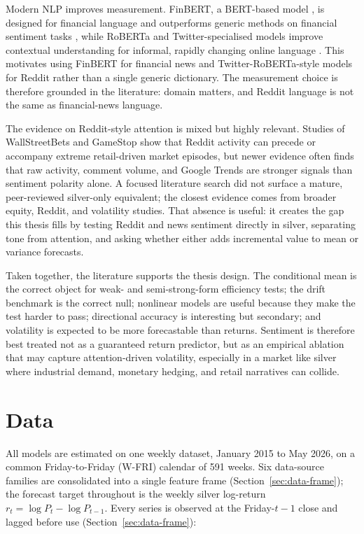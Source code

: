 \documentclass[12pt, a4paper]{article}
\begin{document}
Modern NLP improves measurement. FinBERT, a BERT-based model \parencite{devlin2019}, is
designed for financial language and outperforms
generic methods on financial sentiment tasks \parencite{araci2019}, while RoBERTa and
Twitter-specialised models improve contextual understanding for informal, rapidly changing
online language \parencite{liu2019,loureiro2022}. This motivates using FinBERT for financial
news and Twitter-RoBERTa-style models for Reddit rather than a single generic dictionary.
The measurement choice is therefore grounded in the literature: domain matters, and Reddit
language is not the same as financial-news language.

The evidence on Reddit-style attention is mixed but highly relevant. Studies of WallStreetBets
and GameStop \parencite{lyocsa2022} show that Reddit activity can precede or accompany extreme
retail-driven market episodes, but newer evidence often finds that raw activity, comment volume,
and Google Trends are stronger signals than sentiment polarity alone. A focused literature search did not
surface a mature, peer-reviewed silver-only equivalent; the closest evidence comes from
broader equity, Reddit, and volatility studies. That absence is useful: it creates the gap
this thesis fills by testing Reddit and news sentiment directly in silver, separating tone
from attention, and asking whether either adds incremental value to mean or variance
forecasts.

Taken together, the literature supports the thesis design. The conditional mean is the
correct object for weak- and semi-strong-form efficiency tests; the drift benchmark is the
correct null; nonlinear models are useful because they make the test harder to pass;
directional accuracy is interesting but secondary; and volatility is expected to be more
forecastable than returns. Sentiment is therefore best treated not as a guaranteed return
predictor, but as an empirical ablation that may capture attention-driven volatility,
especially in a market like silver where industrial demand, monetary hedging, and retail
narratives can collide.

\section{Data}
\label{sec:data}

All models are estimated on one weekly dataset, January 2015 to May 2026, on a common
Friday-to-Friday (W-FRI) calendar of 591 weeks. Six data-source families are consolidated
into a single feature frame (Section~\ref{sec:data-frame}); the forecast target throughout
is the weekly silver log-return \(r_t = \log P_t - \log P_{t-1}\). Every series is observed
at the Friday-\(t{-}1\) close and lagged before use (Section~\ref{sec:data-frame}):
\end{document}
